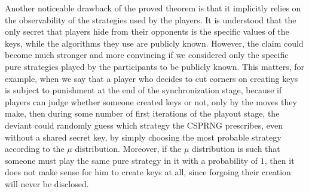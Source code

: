 Another noticeable drawback of the proved theorem is that it implicitly relies on the observability of the strategies used by the players. It is understood that the only secret that players hide from their opponents is the specific values ​​of the keys, while the algorithms they use are publicly known. However, the claim could become much stronger and more convincing if we considered only the specific pure strategies played by the participants to be publicly known. This matters, for example, when we say that a player who decides to cut corners on creating keys is subject to punishment at the end of the synchronization stage, because if players can judge whether someone created keys or not, only by the moves they make, then during some number of first iterations of the playout stage, the deviant could randomly guess which strategy the CSPRNG prescribes, even without a shared secret key, by simply choosing the most probable strategy according to the $\mu$ distribution. Moreover, if the $\mu$ distribution is such that someone must play the same pure strategy in it with a probability of $1$, then it does not make sense for him to create keys at all, since forgoing their creation will never be disclosed. %

